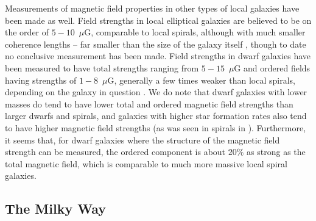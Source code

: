 Measurements of magnetic field properties in other types of local
galaxies have been made as well.  Field strengths in local elliptical
galaxies are believed to be on the order of $5-10$~$\mu$G, comparable to local
spirals, although with much smaller coherence lengths -- far smaller
than the size of the galaxy itself
\cite{1993A&ARv...4..449W,1996MNRAS.279..229M}, though to date no conclusive
measurement has been made.  Field strengths in
dwarf galaxies have been measured to have total 
strengths ranging from $5-15$~$\mu$G and ordered fields having strengths
of $1-8$~$\mu$G, generally a few times weaker than local spirals,
depending on the galaxy in question
\cite{2000A&A...355..128C,2011A&A...529A..94C,2012MNRAS.423L.127R,Mao12,2013MNRAS.435..149N,2014A&A...567A.134J}.
We do note that dwarf galaxies with lower masses do tend to have lower
total and ordered magnetic field strengths than larger dwarfs
and spirals, and galaxies with higher star formation rates also
tend to have higher magnetic field strengths (as was seen in spirals
in \cite{2014arXiv1411.1386V}).  Furthermore, it seems that, for dwarf
galaxies where the structure of the magnetic field strength can be
measured, the ordered component is about $20\%$ as strong as the total
magnetic field, which is comparable to much more massive local spiral galaxies.

\vspace{-3mm}
\subsection{The Milky Way}
\label{sec:milkyway}
\vspace{-2mm}

